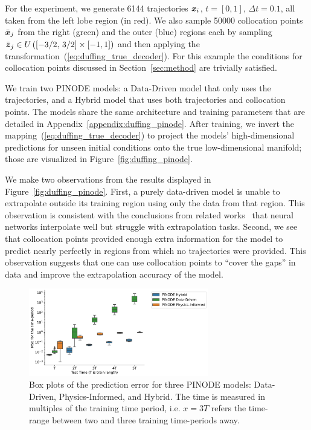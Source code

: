 For the experiment, we generate 6144 trajectories $\boldsymbol{x}_i$, $t=[0, 1]$, $\Delta t = 0.1$, all taken from the left lobe region (in red). We also sample 50000 collocation points $\bar{\boldsymbol{x}}_j$ from the right (green) and the outer (blue) regions each by sampling $\bar{\boldsymbol{z}}_j \in U\left([-3/2,\, 3/2] \times [-1, 1]\right)$ and then applying the transformation~(\ref{eq:duffing_true_decoder}). For this example the conditions for collocation points discussed in Section~\ref{sec:method} are trivially satisfied.


We train two PINODE models: a Data-Driven model that only uses the trajectories, and a Hybrid model that uses both trajectories and collocation points. The models share the same architecture and training parameters that are detailed in Appendix~\ref{appendix:duffing_pinode}. After training, we invert the mapping~(\ref{eq:duffing_true_decoder}) to project the models' high-dimensional predictions for unseen initial conditions onto the true low-dimensional manifold; those are visualized in  Figure~\ref{fig:duffing_pinode}.  




We make two observations from the results displayed in Figure~\ref{fig:duffing_pinode}. First, a purely data-driven model is unable to extrapolate outside its training region using only the data from that region. This observation is consistent with the conclusions from related works~\cite{gin2021deep} that neural networks interpolate well but struggle with extrapolation tasks. Second, we see that collocation points provided enough extra information for the model to predict nearly perfectly in regions from which no trajectories were provided. This observation suggests that one can use collocation points to ``cover the gaps'' in data and improve the extrapolation accuracy of the model. 
\begin{figure}[t]
    \centering
    \includegraphics[width=0.7\textwidth]{figures/duffing_periods.pdf}
    \caption{ Box plots of the prediction error for three PINODE models: Data-Driven, Physics-Informed, and Hybrid. The time is measured in multiples of the training time period, i.e. $x=3T$ refers the time-range between two and three training time-periods away. }%
    \label{fig:duffing_periods}
\end{figure}


